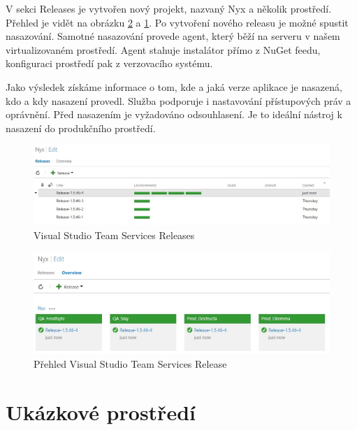 V sekci Releases je vytvořen nový projekt, nazvaný Nyx a několik prostředí. Přehled je vidět na obrázku \ref{fig:releaseman_overview} a \ref{fig:releaseman_releases}. Po vytvoření nového releasu je možné spustit nasazování. Samotné nasazování provede agent, který běží na serveru v našem virtualizovaném prostředí. Agent stahuje instalátor přímo z NuGet feedu, konfiguraci prostředí pak z verzovacího systému.

Jako výsledek získáme informace o tom, kde a jaká verze aplikace je nasazená, kdo a kdy nasazení provedl. Služba podporuje i nastavování přístupových práv a oprávnění. Před nasazením je vyžadováno odsouhlasení. Je to ideální nástroj k nasazení do produkčního prostředí.

\begin{figure}[]
  \centering
  \includegraphics[width=15cm]{fig/releaseman_releases.jpg}
  \caption{Visual Studio Team Services Releases}
  \label{fig:releaseman_releases}
\end{figure}

\begin{figure}[]
  \centering
  \includegraphics[width=15cm]{fig/releaseman_overview.jpg}
  \caption{Přehled Visual Studio Team Services Release}
  \label{fig:releaseman_overview}
\end{figure}

\section{Ukázkové prostředí}

